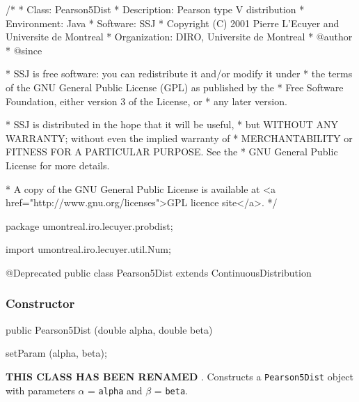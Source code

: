 \begin{code}
\begin{hide}
/*
 * Class:        Pearson5Dist
 * Description:  Pearson type V distribution
 * Environment:  Java
 * Software:     SSJ 
 * Copyright (C) 2001  Pierre L'Ecuyer and Universite de Montreal
 * Organization: DIRO, Universite de Montreal
 * @author       
 * @since

 * SSJ is free software: you can redistribute it and/or modify it under
 * the terms of the GNU General Public License (GPL) as published by the
 * Free Software Foundation, either version 3 of the License, or
 * any later version.

 * SSJ is distributed in the hope that it will be useful,
 * but WITHOUT ANY WARRANTY; without even the implied warranty of
 * MERCHANTABILITY or FITNESS FOR A PARTICULAR PURPOSE.  See the
 * GNU General Public License for more details.

 * A copy of the GNU General Public License is available at
   <a href="http://www.gnu.org/licenses">GPL licence site</a>.
 */
\end{hide}
package umontreal.iro.lecuyer.probdist;
\begin{hide}
import umontreal.iro.lecuyer.util.Num;
\end{hide}
@Deprecated
public class Pearson5Dist extends ContinuousDistribution\begin{hide} {
   protected double alpha;
   protected double beta;
   protected double logam;   // Ln (Gamma(alpha))

\end{hide}\end{code}
\subsubsection* {Constructor}

\begin{code}

   public Pearson5Dist (double alpha, double beta)\begin{hide} {
      setParam (alpha, beta);
   }\end{hide}
\end{code}
\begin{tabb}
\textbf{THIS CLASS HAS BEEN RENAMED }.
   Constructs a \texttt{Pearson5Dist} object with parameters
   $\alpha$ = \texttt{alpha} and $\beta$ = \texttt{beta}.
\end{tabb}

